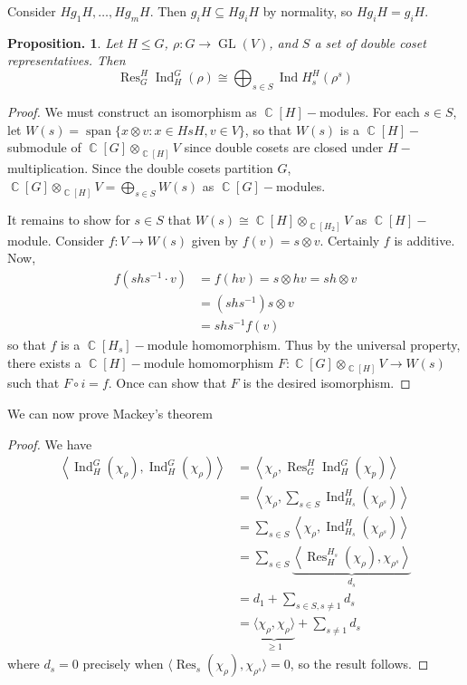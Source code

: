 \documentclass[11pt, a4paper]{memoir}
\DeclareMathOperator{\C}{{\mathbb{C}}}
\theoremstyle{change}
\newtheorem{proposition}[theorem]{Proposition.}
\theoremstyle{plain}
\theoremstyle{nonumberplain}
\newtheorem{proof}{Proof}
\DeclareMathOperator{\GL}{GL}
\DeclareMathOperator{\Res}{Res}
\DeclareMathOperator{\spn}{span}
\DeclareMathOperator{\Ind}{Ind}
\numberwithin{equation}{section}
\begin{document}
Consider $Hg_1H,\ldots,Hg_mH$.
Then $g_iH\subseteq Hg_iH$ by normality, so $Hg_iH=g_iH$.
\begin{proposition}
    Let $H\leq G$, $\rho:G\to\GL(V)$, and $S$ a set of double coset representatives.
    Then
    \begin{equation*}
        \Res_G^H\Ind_H^G(\rho)\cong\bigoplus_{s\in S}\Ind H_s^H(\rho^s)
    \end{equation*}
\end{proposition}
\begin{proof}
    We must construct an isomorphism as $\C[H]-$modules.
    For each $s\in S$, let $W(s)=\spn\{x\otimes v:x\in HsH,v\in V\}$, so that $W(s)$ is a $\C[H]-$submodule of $\C[G]\otimes_{\C[H]}V$ since double cosets are closed under $H-$multiplication.
    Since the double cosets partition $G$, $\C[G]\otimes_{\C[H]}V=\bigoplus_{s\in S}W(s)$ as $\C[G]-$modules.

    It remains to show for $s\in S$ that $W(s)\cong\C[H]\otimes_{\C[H_2]}V$ as $\C[H]-$module.
    Consider $f:V\to W(s)$ given by $f(v)=s\otimes v$.
    Certainly $f$ is additive.
    Now,
    \begin{align*}
        f(shs^{-1}\cdot v)&=f(hv)=s\otimes hv=sh\otimes v\\
                          &= (shs^{-1})s\otimes v\\
                          &= shs^{-1}f(v)
    \end{align*}
    so that $f$ is a $\C[H_s]-$module homomorphism.
    Thus by the universal property, there exists a $\C[H]-$module homomorphism $F:\C[G]\otimes_{\C[H]}V\to W(s)$ such that $F\circ i=f$.
    Once can show that $F$ is the desired isomorphism.
\end{proof}
We can now prove Mackey's theorem
\begin{proof}
    We have
    \begin{align*}
        \left\langle\Ind_H^G(\chi_\rho),\Ind_H^G(\chi_\rho)\right\rangle &= \left\langle\chi_\rho,\Res_G^H\Ind_H^G(\chi_p)\right\rangle\\
                                                                         &= \left\langle\chi_\rho,\sum_{s\in S}\Ind_{H_s}^H(\chi_{\rho^s})\right\rangle\\
                                                                         &= \sum_{s\in S}\left\langle\chi_\rho,\Ind_{H_s}^H(\chi_{\rho^s})\right\rangle\\
                                                                         &= \sum_{s\in S}\underbrace{\left\langle \Res_H^{H_s}(\chi_\rho),\chi_{\rho^s}\right\rangle}_{d_s}\\
                                                                         &= d_1+\sum_{s\in S,s\neq 1}d_s\\
                                                                         &= \underbrace{\langle\chi_\rho,\chi_\rho\rangle}_{\geq 1}+\sum_{s\neq 1}d_s
    \end{align*}
    where $d_s=0$ precisely when $\langle\Res_s(\chi_\rho),\chi_{\rho^s}\rangle=0$, so the result follows.
\end{proof}
\end{document}
